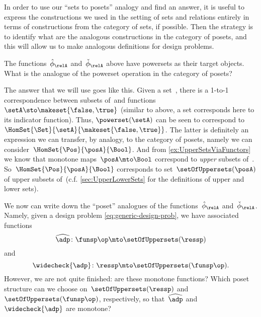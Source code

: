 In order to use our ``sets to posets'' analogy and find an answer, it is useful to express the constructions we used in the setting of sets and relations entirely in terms of constructions from the category of sets, if possible.
Then the strategy is to identify what are the analogous constructions in the category of posets, and this will allow us to make analogous definitions for design problems.

The functions~$\hat \phi_{\relA}$ and~$\check \phi_{\relA}$ above have powersets as their target objects.
What is the analogue of the powerset operation in the category of posets?

The answer that we will use goes like this.
Given a set~\setA, there is a 1-to-1 correspondence between subsets of~\setA and functions~$\setA \sto \makeset{ \false, \true }$ (similar to above, a set corresponds here to its indicator function).
Thus, $\powerset (\setA)$ can be seen to correspond to~$\HomSet{\Set}{\setA}{\makeset{ \false, \true}}$.
The latter is definitely an expression we can transfer, by analogy, to the category of posets, namely we can consider~$\HomSet{\Pos}{\posA}{\Bool}$.
And from \cref{ex:UpperSetsViaFunctors} we know that monotone maps~$\posA \mto \Bool$ correspond to \emph{upper} subsets of~\posA.
So~$\HomSet{\Pos}{\posA}{\Bool}$ corresponds to set~$\setOfUppersets (\posA)$ of upper subsets of~\posA (c.f.
\cref{sec:UpperLowerSets} for the definitions of upper and lower sets).

We now can write down the ``poset'' analogues of the functions~$\hat \phi_{\relA}$ and~$\check \phi_{\relA}$.
Namely, given a design problem \cref{eq:generic-design-prob}, we have associated functions
\begin{equation}
    \label{eq:dp-left-curry}
    \widehat{\adp} \colon \funsp\op \mto \setOfUppersets (\ressp)
\end{equation}
and
\begin{equation}
    \label{eq:dp-right-curry}
    \widecheck{\adp} \colon \ressp \mto \setOfUppersets (\funsp\op).
\end{equation}
However, we are not quite finished: are these monotone functions?
Which poset structure can we choose on~$\setOfUppersets (\ressp)$ and~$\setOfUppersets (\funsp\op)$, respectively, so that~$\widehat{\adp}$ and~$\widecheck{\adp}$ are monotone?

